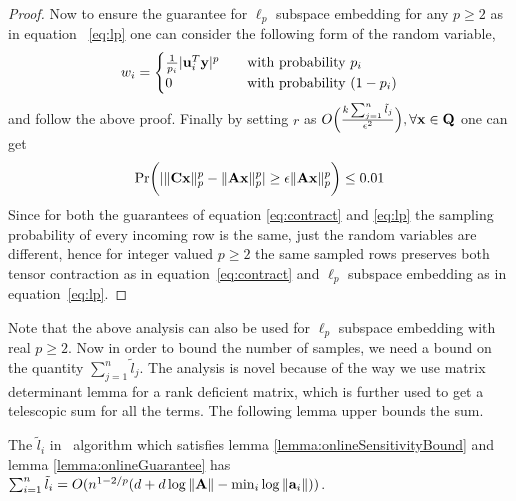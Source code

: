 \begin{proof}{\label{proof:onlineGuarantee}}
 Now to ensure the guarantee for $\ell_{p}$ subspace embedding for any $p \geq 2$ as in equation ~\eqref{eq:lp} one can consider the following form of the random variable, 
 \[ w_{i} =
  \begin{cases}
    \frac{1}{p_{i}}|\mathbf{u}_{i}^{T}\mathbf{y}|^{p}  & \quad \text{with probability } p_{i} \\
    0 & \quad \text{with probability } (1-p_{i})
  \end{cases}
 \]
and follow the above proof. Finally by setting $r$ as $O\Big(\frac{k\sum_{j=1}^{n}\tilde{l}_{j}} {\epsilon^{2}}\Big), \forall \mathbf{x} \in \mathbf{Q}$ one can get
\begin{equation*}
 \mbox{Pr}\bigg(|\|\mathbf{C}\mathbf{x}\|_{p}^{p} - \|\mathbf{A}\mathbf{x}\|_{p}^{p}| \geq \epsilon \|\mathbf{A}\mathbf{x}\|_{p}^{p}\bigg) \leq 0.01
\end{equation*}
Since for both the guarantees of equation \eqref{eq:contract} and \eqref{eq:lp} the sampling probability of every incoming row is the same, just the random variables are different, hence for integer valued $p \geq 2$ the same sampled rows preserves both tensor contraction as in equation~\eqref{eq:contract} and $\ell_{p}$ subspace embedding as in equation~\eqref{eq:lp}.
\end{proof}
% 
Note that the above analysis can also be used for $\ell_{p}$ subspace embedding with real $p \geq 2$. Now in order to bound the number of samples, we need a bound on the quantity $\sum_{j=1}^{n}\tilde{l}_{j}$. The analysis is novel because of the way we use matrix determinant lemma for a rank deficient matrix, which is further used to get a telescopic sum for all the terms.
The following lemma upper bounds the sum.
\begin{lemma}{\label{lemma:onlineSummationBound}}
 The $\tilde{l}_{i}$ in \online~algorithm which satisfies lemma \ref{lemma:onlineSensitivityBound} and lemma \ref{lemma:onlineGuarantee} has
 $\sum_{i=1}^{n}\tilde{l}_{i}=O(n^{1-2/p}(d+d\log \|\mathbf{A}\| - \min_{i}\log \|\mathbf{a}_{i}\|))$.
\end{lemma}
% 
